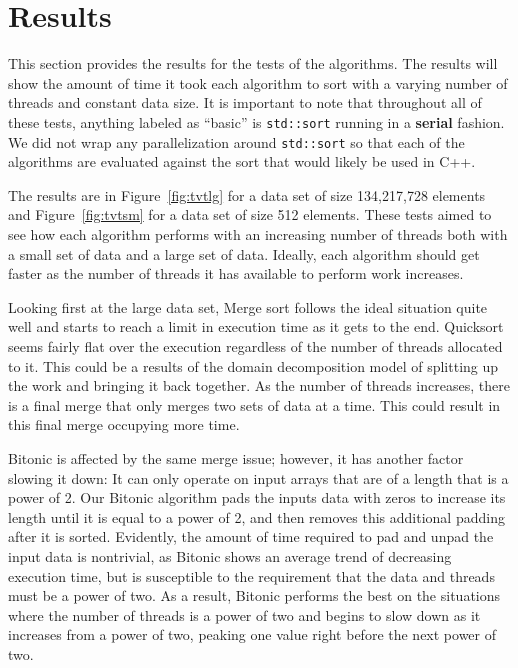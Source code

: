 \documentclass[journal]{IEEEtran}
\begin{document}
\section{Results}
\label{sec:results}
This section provides the results for the tests of the algorithms. The results will show the amount of time it took each algorithm to sort with a varying number of threads and constant data size. It is important to note that throughout all of these tests, anything labeled as ``basic'' is \texttt{std::sort} running in a \textbf{serial} fashion. We did not wrap any parallelization around \texttt{std::sort} so that each of the algorithms are evaluated against the sort that would likely be used in C++.

The results are in Figure~\ref{fig:tvtlg} for a data set of size 134,217,728 elements and Figure~\ref{fig:tvtsm} for a data set of size 512 elements. These tests aimed to see how each algorithm performs with an increasing number of threads both with a small set of data and a large set of data. Ideally, each algorithm should get faster as the number of threads it has available to perform work increases.

Looking first at the large data set, Merge sort follows the ideal situation quite well and starts to reach a limit in execution time as it gets to the end. Quicksort seems fairly flat over the execution regardless of the number of threads allocated to it. This could be a results of the domain decomposition model of splitting up the work and bringing it back together. As the number of threads increases, there is a final merge that only merges two sets of data at a time. This could result in this final merge occupying more time. 

Bitonic is affected by the same merge issue; however, it has another factor slowing it down:  It can only operate on input arrays that are of a length that is a power of 2.  Our Bitonic algorithm pads the inputs data with zeros to increase its length until it is equal to a power of 2, and then removes this additional padding after it is sorted.  Evidently, the amount of time required to pad and unpad the input data is nontrivial, as Bitonic shows an average trend of decreasing execution time, but is susceptible to the requirement that the data and threads must be a power of two. As a result, Bitonic performs the best on the situations where the number of threads is a power of two and begins to slow down as it increases from a power of two, peaking one value right before the next power of two.  
\end{document}
